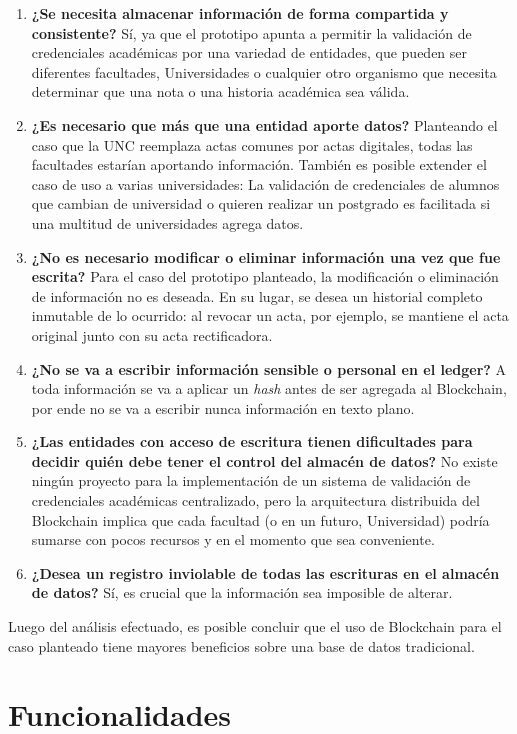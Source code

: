 \begin{enumerate}
    \item \textbf{¿Se necesita almacenar información de forma compartida y consistente?} Sí, ya que el prototipo apunta a permitir la validación de credenciales académicas por una variedad de entidades, que pueden ser diferentes facultades, Universidades o cualquier otro organismo que necesita determinar que una nota o una historia académica sea válida.
    \item \textbf{¿Es necesario que más que una entidad aporte datos?} Planteando el caso que la UNC reemplaza actas comunes por actas digitales, todas las facultades estarían aportando información. También es posible extender el caso de uso a varias universidades: La validación de credenciales de alumnos que cambian de universidad o quieren realizar un postgrado es facilitada si una multitud de universidades agrega datos.
    \item \textbf{¿No es necesario modificar o eliminar información una vez que fue escrita?} Para el caso del prototipo planteado, la modificación o eliminación de información no es deseada. En su lugar, se desea un historial completo inmutable de lo ocurrido: al revocar un acta, por ejemplo, se mantiene el acta original junto con su acta rectificadora.
    \item \textbf{¿No se va a escribir información sensible o personal en el ledger?} A toda información se va a aplicar un \textit{hash} antes de ser agregada al Blockchain, por ende no se va a escribir nunca información en texto plano.
    \item \textbf{¿Las entidades con acceso de escritura tienen dificultades para decidir quién debe tener el control del almacén de datos?} No existe ningún proyecto para la implementación de un sistema de validación de credenciales académicas centralizado, pero la arquitectura distribuida del Blockchain implica que cada facultad (o en un futuro, Universidad) podría sumarse con pocos recursos y en el momento que sea conveniente.
    \item \textbf{¿Desea un registro inviolable de todas las escrituras en el almacén de datos?} Sí, es crucial que la información sea imposible de alterar.
\end{enumerate}

Luego del análisis efectuado, es posible concluir que el uso de Blockchain para el caso planteado tiene mayores beneficios sobre una base de datos tradicional.

\section{Funcionalidades} \label{sec:funcionalidades}

